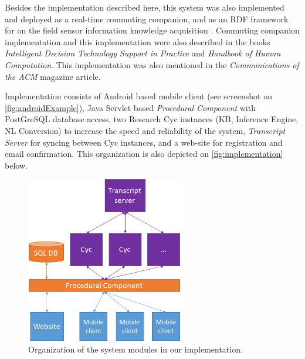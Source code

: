 Besides the implementation described here, this system was also implemented and
deployed as a real-time commuting companion\parencite{Figueiras2013}, and as an
RDF framework for on the field sensor information knowledge acquisition
\parencite{Bradesko2012a}. Commuting companion implementation and this 
implementation were also described in the books \emph{Intelligent Decision 
Technology Support in Practice}\parencite{Costa2016} and \emph{Handbook of Human 
Computation}\parencite{Witbrock2013}. This implementation was also mentioned
in the \emph{Communications of the ACM} magazine article\parencite{Geller2016}.

Implementation consists of Android based mobile client (see screenshot on
\autoref{fig:androidExample}), Java Servlet based
\emph{Procedural Component} with PostGreSQL database access, two Research 
Cyc instances 
(KB, Inference Engine, NL Conversion) to increase the speed and reliability 
of the system, \emph{Transcript Server} for syncing between Cyc instances, 
and a web-site for registration and email confirmation. This organization is 
also depicted on \autoref{fig:implementation} below.

\begin{figure}[H]
	\centering
		\includegraphics[width=0.62\textwidth]{figures/implementationOrg.png}
	\caption{Organization of the system modules in our implementation.}
	\label{fig:implementation}
\end{figure}

